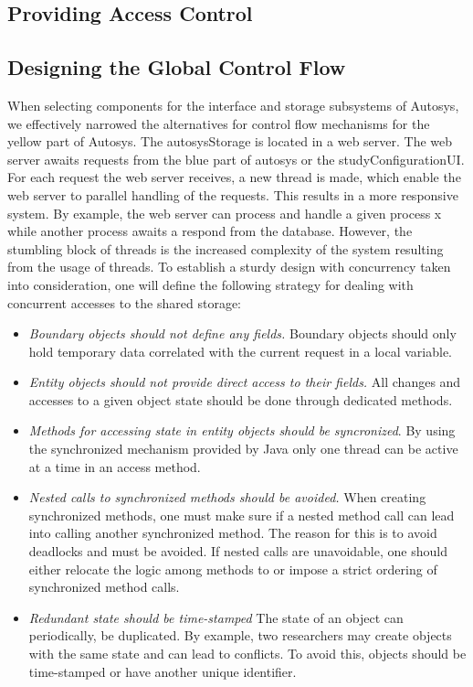 \subsection{Providing Access Control}

\subsection{Designing the Global Control Flow}
When selecting components for the interface and storage subsystems of Autosys, we effectively narrowed the alternatives for control flow mechanisms for the yellow part of Autosys. The autosysStorage is located in a web server. The web server awaits requests from the blue part of autosys or the studyConfigurationUI. For each request the web server receives, a new thread is made, which enable the web server to parallel handling of the requests. This results in a more responsive system. By example, the web server can process and handle a given process x while another process awaits a respond from the database. However, the stumbling block of threads is the increased complexity of the system resulting from the usage of threads. To establish a sturdy design with concurrency taken into consideration, one will define the following strategy for dealing with concurrent accesses to the shared storage:
\begin{itemize}
	\item \textit{Boundary objects should not define any fields.} Boundary objects should only hold temporary data correlated with the current request in a local variable.
	\item \textit{Entity objects should not provide direct access to their fields.} All changes and accesses to a given object state should be done through dedicated methods. 
	\item \textit{Methods for accessing state in entity objects should be syncronized}. By using the synchronized mechanism provided by Java only one thread can be active at a time in an access method.
	\item \textit{Nested calls to synchronized methods should be avoided.} When creating synchronized methods, one must make sure if a nested method call can lead into calling another synchronized method. The reason for this is to avoid deadlocks and must be avoided. If nested calls are unavoidable, one should either relocate the logic among methods to or impose a strict ordering of synchronized method calls.
	\item \textit{Redundant state should be time-stamped} The state of an object can periodically, be duplicated. By example, two researchers may create objects with the same state and can lead to conflicts. To avoid this, objects should be time-stamped or have another unique identifier.

\end{itemize}


